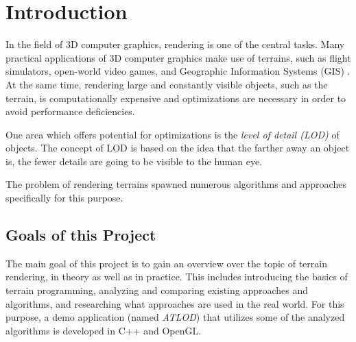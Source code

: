 \chapter{Introduction}
In the field of 3D computer graphics, rendering is one of the central tasks.
Many practical applications of 3D computer graphics make use of terrains, 
such as flight simulators, open-world video games, and Geographic Information Systems (GIS) \cite[p.~185]{lodfor3dgraphics}.
At the same time, rendering large and constantly visible objects, such as the terrain, is computationally expensive 
and optimizations are necessary in order to avoid performance deficiencies.

One area which offers potential for optimizations is the \textit{level of detail (LOD)} of objects.
The concept of LOD is based on the idea that the farther away an object is, the fewer details are going to be visible to the human eye.

The problem of rendering terrains spawned numerous algorithms and approaches specifically
for this purpose.

\section{Goals of this Project}
The main goal of this project is to gain an overview over the topic of 
terrain rendering, in theory as well as in practice. 
This includes introducing the basics of terrain programming,
analyzing and comparing existing approaches and algorithms, and
researching what approaches are used in the real world.
For this purpose, a demo application (named \textit{ATLOD}) that 
utilizes some of the analyzed algorithms is developed
in C++ and OpenGL.


